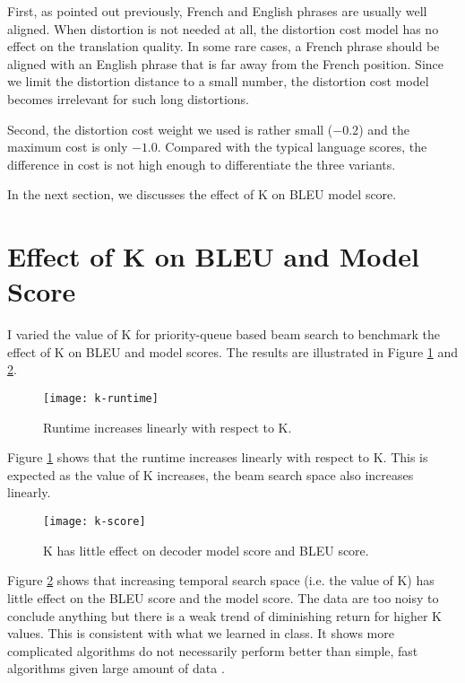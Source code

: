 \documentclass[12pt]{article}   %
\begin{document}
First, as pointed out previously, French and English phrases are usually well aligned. When distortion is not needed at all, the distortion cost model has no effect on the translation quality. In some rare cases, a French phrase should be aligned with an English phrase that is far away from the French position. Since we limit the distortion distance to a small number, the distortion cost model becomes irrelevant for such long distortions.

Second, the distortion cost weight we used is rather small ($-0.2$) and the maximum cost is only $-1.0$. Compared with the typical language scores, the difference in cost is not high enough to differentiate the three variants.

In the next section, we discusses the effect of K on BLEU model score.




\section{Effect of K on BLEU and Model Score}
\label{sec:k}
I varied the value of K for priority-queue based beam search to benchmark the effect of K on BLEU and model scores. The results are illustrated in Figure \ref{fig:kruntime} and \ref{fig:kscore}. 

\begin{figure}[h*]
	\centering
	\texttt{[image: k-runtime]}
	\caption{Runtime increases linearly with respect to K.}
	\label{fig:kruntime}
\end{figure}

Figure \ref{fig:kruntime} shows that the runtime increases linearly with respect to K. This is expected as the value of K increases, the beam search space also increases linearly.

\begin{figure}[h*]
	\centering
	\texttt{[image: k-score]}
	\caption{K has little effect on decoder model score and BLEU score.}
	\label{fig:kscore}
\end{figure}

Figure \ref{fig:kscore} shows that increasing temporal search space (i.e. the value of K) has little effect on the BLEU score and the model score. The data are too noisy to conclude anything but there is a weak trend of diminishing return for higher K values. This is consistent with what we learned in class. It shows more complicated algorithms do not necessarily perform better than simple, fast algorithms given large amount of data \cite{dataeffect}.
\end{document}

